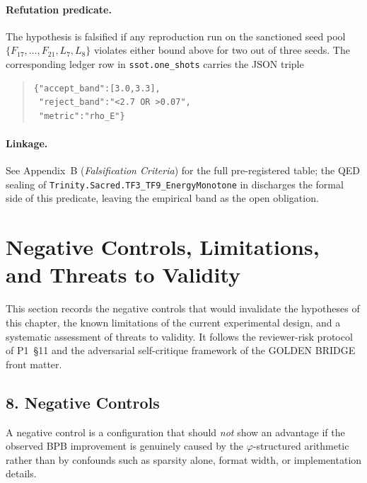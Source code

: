 \paragraph{Refutation predicate.}
The hypothesis is falsified if any reproduction run on the sanctioned seed
pool $\{F_{17},\dots,F_{21},L_7,L_8\}$ violates either bound above for two
out of three seeds. The corresponding ledger row in
\texttt{ssot.one\_shots} carries the JSON triple
\begin{quote}\footnotesize
\begin{verbatim}
{"accept_band":[3.0,3.3],
 "reject_band":"<2.7 OR >0.07",
 "metric":"rho_E"}
\end{verbatim}
\end{quote}

\paragraph{Linkage.}
See Appendix~B (\emph{Falsification Criteria}) for the full pre-registered
table; the QED sealing of \texttt{Trinity.Sacred.TF3\_TF9\_EnergyMonotone} in
 discharges the formal side of this
predicate, leaving the empirical band as the open obligation.

\section{Negative Controls, Limitations, and Threats to Validity}
\label{fa_08:sec:negative-controls}

This section records the negative controls that would invalidate the
hypotheses of this chapter, the known limitations of the current
experimental design, and a systematic assessment of threats to validity.
It follows the reviewer-risk protocol of P1~§11 and the adversarial
self-critique framework of the GOLDEN BRIDGE front matter.

\subsection{8. Negative Controls}\label{fa_08:sec:neg-controls}

A negative control is a configuration that should \emph{not} show an
advantage if the observed BPB improvement is genuinely caused by the
\(\varphi\)-structured arithmetic rather than by confounds such as
sparsity alone, format width, or implementation details.

